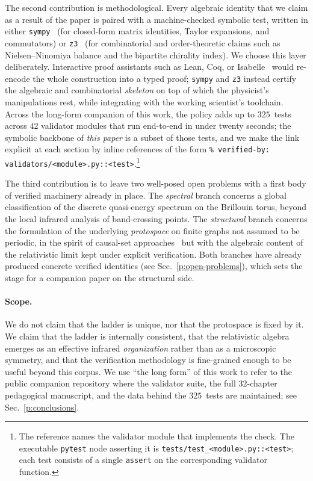 The second contribution is methodological. Every algebraic identity that
we claim as a result of the paper is paired with a machine-checked
symbolic test, written in either \texttt{sympy}~\cite{Meurer2017} (for
closed-form matrix identities, Taylor expansions, and commutators) or
\texttt{z3}~\cite{deMoura2008} (for combinatorial and order-theoretic
claims such as Nielsen--Ninomiya balance and the bipartite chirality
index). We choose this layer deliberately. Interactive proof assistants
such as Lean, Coq, or Isabelle~\cite{Buzzard2022} would re-encode the
whole construction into a typed proof; \texttt{sympy} and \texttt{z3}
instead certify the algebraic and combinatorial \emph{skeleton} on top of
which the physicist's manipulations rest, while integrating with the
working scientist's toolchain. Across the long-form companion of this
work, the policy adds up to $325$~tests across $42$ validator modules
that run end-to-end in under twenty seconds; the symbolic backbone of
\emph{this paper} is a subset of those tests, and we make the link
explicit at each section by inline references of the form
\texttt{\% verified-by: validators/\textless module\textgreater.py::\textless test\textgreater}.\footnote{The
reference names the validator module that implements the check. The
executable \texttt{pytest} node asserting it is
\texttt{tests/test\_\textless module\textgreater.py::\textless test\textgreater};
each test consists of a single \texttt{assert} on the corresponding
validator function.}

The third contribution is to leave two well-posed open problems with a
first body of verified machinery already in place. The
\emph{spectral} branch concerns a global classification of the discrete
quasi-energy spectrum on the Brillouin torus, beyond the local infrared
analysis of band-crossing points. The \emph{structural} branch concerns
the formulation of the underlying \emph{protospace} on finite graphs not
assumed to be periodic, in the spirit of causal-set
approaches~\cite{BombelliLeeMeyerSorkin1987,Sorkin2003} but with the
algebraic content of the relativistic limit kept under explicit
verification. Both branches have already produced concrete verified
identities (see Sec.~\ref{p:open-problems}), which sets the stage for a
companion paper on the structural side.

\paragraph{Scope.} We do not claim that the ladder is unique, nor that
the protospace is fixed by it. We claim that the ladder is internally
consistent, that the relativistic algebra emerges as an effective
infrared \emph{organization} rather than as a microscopic symmetry, and
that the verification methodology is fine-grained enough to be useful
beyond this corpus. We use \enquote{the long form} of this work to
refer to the public companion repository where the validator suite, the
full $32$-chapter pedagogical manuscript, and the data behind the
$325$~tests are maintained; see Sec.~\ref{p:conclusions}.
